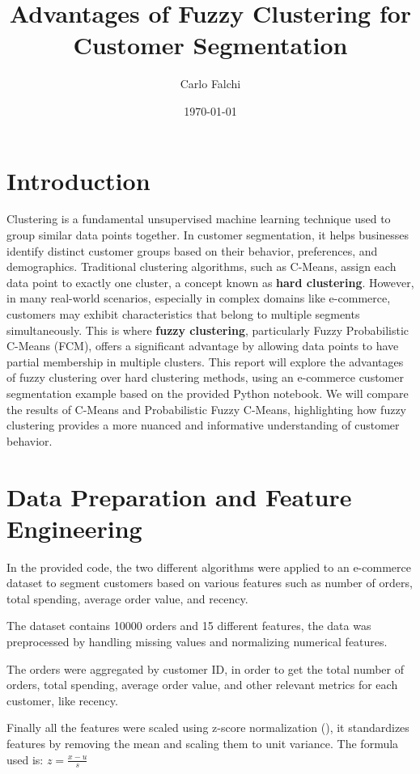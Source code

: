 \documentclass[12pt, a4paper]{article}
\title{\textbf{Advantages of Fuzzy Clustering for Customer Segmentation}}
\author{Carlo Falchi}
\date{\today}
\begin{document}
\maketitle

\section{Introduction}
Clustering is a fundamental unsupervised machine learning technique used to group similar data points together. In customer segmentation, it helps businesses identify distinct customer groups based on their behavior, preferences, and demographics. Traditional clustering algorithms, such as C-Means, assign each data point to exactly one cluster, a concept known as \textbf{hard clustering}. 
However, in many real-world scenarios, especially in complex domains like e-commerce, customers may exhibit characteristics that belong to multiple segments simultaneously. This is where \textbf{fuzzy clustering}, particularly Fuzzy Probabilistic C-Means (FCM), offers a significant advantage by allowing data points to have partial membership in multiple clusters.
This report will explore the advantages of fuzzy clustering over hard clustering methods, using an e-commerce customer segmentation example based on the provided Python notebook. 
We will compare the results of C-Means and Probabilistic Fuzzy C-Means, highlighting how fuzzy clustering provides a more nuanced and informative understanding of customer behavior.

\section{Data Preparation and Feature Engineering}

In the provided code, the two different algorithms were applied to an e-commerce dataset \cite{millat2024ecommerce} to segment customers based on various features such as number of orders, total spending, average order value, and recency.

The dataset contains 10000 orders and 15 different features, the data was preprocessed by handling missing values and normalizing numerical features.

The orders were aggregated by customer ID, in order to get the total number of orders, total spending, average order value, and other relevant metrics for each customer, like recency.

Finally all the features were scaled using z-score normalization (\cite{scikit-learn}), it standardizes features by removing the mean and scaling them to unit variance. The formula used is: $z = \frac{x - u}{s}$
\end{document}
